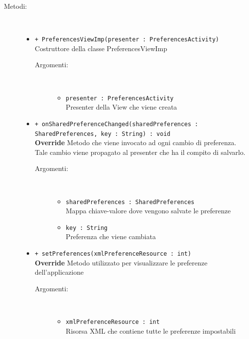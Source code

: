 \documentclass[../DefinizioneDiProdotto.tex]{subfiles}
\begin{document}
\begin{description}
\begin{itemize}
	\end{itemize}
	\item[Metodi:] \
	\begin{itemize}
		\item \texttt{+ PreferencesViewImp(presenter : PreferencesActivity)}\\
		Costruttore della classe PreferencesViewImp
		\begin{description}
			\item[Argomenti:] \
			\begin{itemize}
				\item \texttt{presenter : PreferencesActivity}\\
				Presenter della View che viene creata\end{itemize}
		\end{description}
		\item \texttt{+ onSharedPreferenceChanged(sharedPreferences : SharedPreferences, key : String) : void}\\
		\textbf{Override} Metodo che viene invocato ad ogni cambio di preferenza. Tale cambio viene propagato al presenter che ha il compito di salvarlo.
		\begin{description}
			\item[Argomenti:] \
			\begin{itemize}
				\item \texttt{sharedPreferences : SharedPreferences}\\
				Mappa chiave-valore dove vengono salvate le preferenze\item \texttt{key : String}\\
				Preferenza che viene cambiata\end{itemize}
		\end{description}
		\item \texttt{+ setPreferences(xmlPreferenceResource : int)}\\
		\textbf{Override} Metodo utilizzato per visualizzare le preferenze dell'applicazione
		\begin{description}
			\item[Argomenti:] \
			\begin{itemize}
				\item \texttt{xmlPreferenceResource : int}\\
				Risorsa XML che contiene tutte le preferenze impostabili\end{itemize}
		\end{description}
	\end{itemize}
\end{description}
\end{document}
